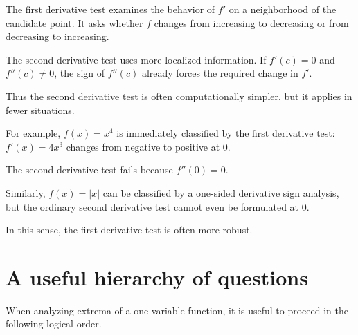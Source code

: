 \documentclass{essay}
\begin{document}
The first derivative test examines the behavior of \(f'\) on a neighborhood of the candidate point. It asks whether \(f\) changes from increasing to decreasing or from decreasing to increasing.

The second derivative test uses more localized information. If \(f'(c)=0\) and \(f''(c)\neq0\), the sign of \(f''(c)\) already forces the required change in \(f'\).

Thus the second derivative test is often computationally simpler, but it applies in fewer situations.

For example, \(f(x)=x^4\) is immediately classified by the first derivative test: \(f'(x)=4x^3\) changes from negative to positive at \(0\).

The second derivative test fails because \(f''(0)=0\).

Similarly, \(f(x)=|x|\) can be classified by a one-sided derivative sign analysis, but the ordinary second derivative test cannot even be formulated at \(0\).

In this sense, the first derivative test is often more robust.

\section{A useful hierarchy of questions}

When analyzing extrema of a one-variable function, it is useful to proceed in the following logical order.
\end{document}
